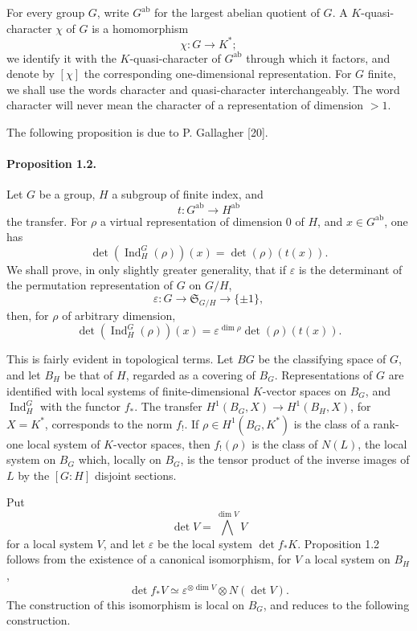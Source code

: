 \documentclass[10pt]{article}
\newcommand{\Ind}{\operatorname{Ind}}
\begin{document}
For every group \(G\), write \(G^{\mathrm{ab}}\) for the largest abelian quotient of \(G\). A \(K\)-quasi-character \(\chi\) of \(G\) is a homomorphism
\[
\chi:G\longrightarrow K^*;
\]
we identify it with the \(K\)-quasi-character of \(G^{\mathrm{ab}}\) through which it factors, and denote by \([\chi]\) the corresponding one-dimensional representation. For \(G\) finite, we shall use the words character and quasi-character interchangeably. The word character will never mean the character of a representation of dimension \(>1\).

The following proposition is due to P. Gallagher [20].

\paragraph{Proposition 1.2.} Let \(G\) be a group, \(H\) a subgroup of finite index, and
\[
t:G^{\mathrm{ab}}\longrightarrow H^{\mathrm{ab}}
\]
the transfer. For \(\rho\) a virtual representation of dimension \(0\) of \(H\), and \(x\in G^{\mathrm{ab}}\), one has
\[
\det(\Ind_H^G(\rho))(x)=\det(\rho)(t(x)).
\]
We shall prove, in only slightly greater generality, that if \(\varepsilon\) is the determinant of the permutation representation of \(G\) on \(G/H\),
\[
\varepsilon:G\longrightarrow \mathfrak S_{G/H}\longrightarrow \{\pm1\},
\]
then, for \(\rho\) of arbitrary dimension,
\[
\det(\Ind_H^G(\rho))(x)=\varepsilon^{\dim\rho}\det(\rho)(t(x)).
\]

This is fairly evident in topological terms. Let \(BG\) be the classifying space of \(G\), and let \(B_H\) be that of \(H\), regarded as a covering of \(B_G\). Representations of \(G\) are identified with local systems of finite-dimensional \(K\)-vector spaces on \(B_G\), and \(\Ind_H^G\) with the functor \(f_*\). The transfer \(H^1(B_G,X)\to H^1(B_H,X)\), for \(X=K^*\), corresponds to the norm \(f_!\). If \(\rho\in H^1(B_G,K^*)\) is the class of a rank-one local system of \(K\)-vector spaces, then \(f_!(\rho)\) is the class of \(N(L)\), the local system on \(B_G\) which, locally on \(B_G\), is the tensor product of the inverse images of \(L\) by the \([G:H]\) disjoint sections.

Put
\[
\det V=\bigwedge^{\dim V}V
\]
for a local system \(V\), and let \(\varepsilon\) be the local system \(\det f_*K\). Proposition 1.2 follows from the existence of a canonical isomorphism, for \(V\) a local system on \(B_H\),
\[
\det f_*V\simeq \varepsilon^{\otimes\dim V}\otimes N(\det V).
\]
The construction of this isomorphism is local on \(B_G\), and reduces to the following construction.
\end{document}
